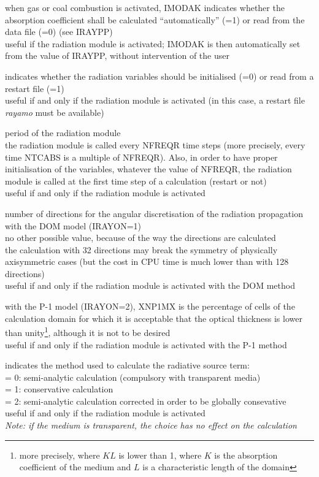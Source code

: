 {when gas or coal combustion is activated, IMODAK indicates whether the
absorption coefficient shall be calculated ``automatically'' (=1) or read from
the data file (=0) (see IRAYPP)\\
useful if the radiation module is activated; IMODAK is then automatically set
from the value of IRAYPP, without intervention of the user}

{indicates whether the radiation variables should be initialised (=0) or read
from a restart file (=1)\\
useful if and only if the radiation module is activated (in this case, a
restart file {\em rayamo} must be available)}

{period of the radiation module\\
the radiation module is called every NFREQR time steps (more precisely, every
time NTCABS is a multiple of NFREQR). Also, in order to have proper
initialisation of the variables, whatever the value of NFREQR, the radiation
module is called at the first time step of a calculation (restart or not)\\
useful if and only if the radiation module is activated}

{number of directions for the angular discretisation of the radiation
propagation with the DOM model (IRAYON=1)\\
no other possible value, because of the way the directions are calculated\\
the calculation with 32 directions may break the symmetry of
physically axisymmetric cases (but the cost in CPU time is much lower
 than with 128 directions)\\
useful if and only if the radiation module is activated with the DOM method}

{with the P-1 model (IRAYON=2), XNP1MX is the percentage of cells of
the calculation domain for which it is acceptable that the optical
thickness is lower than unity\footnote{more precisely, where $KL$ is lower than
1, where $K$ is the absorption coefficient of the medium and $L$ is a
characteristic length of the domain}, although it is not to be desired\\
useful if and only if the radiation module is activated with the P-1 method}

{indicates the method used to calculate the radiative source term:\\
\hspace*{1.3cm}= 0: semi-analytic calculation (compulsory with transparent
media)\\
\hspace*{1.3cm}= 1: conservative calculation\\
\hspace*{1.3cm}= 2: semi-analytic calculation corrected in order to be
globally consevative\\
useful if and only if the radiation module is activated\\
{\em Note: if the medium is transparent, the choice has no effect on the calculation}}

